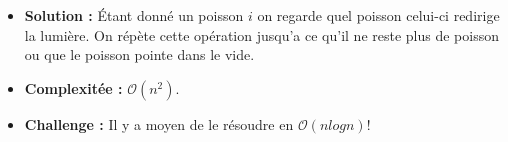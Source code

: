 \begin{frame}
    \frametitle{\problemtitle}
    \begin{itemize}
        \begin{block}{Problème}
            On a $n$ poisson avec des directions, déterminer la taille du banc étant donné un poissoné donné.
        \end{block}
        \item<+-> \textbf{Solution :} Étant donné un poisson $i$ on regarde quel poisson celui-ci redirige la lumière. On répète cette opération jusqu'a ce qu'il ne reste plus de poisson ou que le poisson pointe dans le vide. 
        \item<+-> \textbf{Complexitée :} $\mathcal{O}(n^2)$.
        \item<+-> \textbf{Challenge :} Il y a moyen de le résoudre en $\mathcal{O}(n log n) ! $
    \end{itemize}
    \solvestats
\end{frame}
